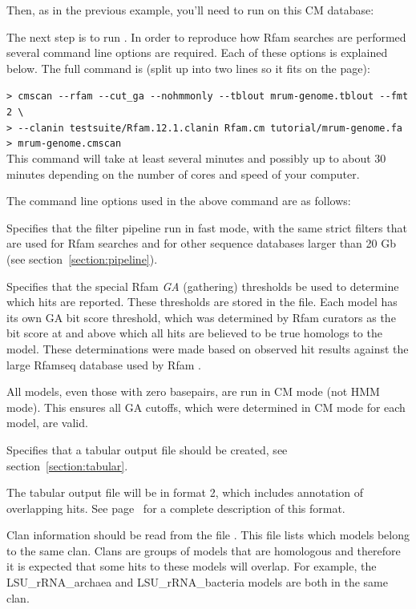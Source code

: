 

Then, as in the previous example, you'll need to run  on
this CM database:


The next step is to run . In order to reproduce how Rfam
searches are performed \citep{Nawrocki15} several command line
options are required. Each of these options is explained below. The
full command is (split up into two lines so it fits on the page): 

\indent\indent\small\verb+> cmscan --rfam --cut_ga --nohmmonly --tblout mrum-genome.tblout --fmt 2 \+\\
\indent\indent\small\verb+> --clanin testsuite/Rfam.12.1.clanin Rfam.cm tutorial/mrum-genome.fa > mrum-genome.cmscan+\\

This command will take at least several minutes and possibly up to
about 30 minutes depending on the number of cores and speed of your
computer. 

The command line options used in the above command are as follows:

\begin{sreitems}{}
\item[\otext{--rfam}] Specifies that the filter pipeline run in fast
  mode, with the same strict filters that are used for Rfam searches
  and for other sequence databases larger than 20 Gb (see
  section~\ref{section:pipeline}). 
%
\item[\otext{--cut\_ga}] Specifies that the special Rfam \emph{GA}
  (gathering) thresholds be used to determine which hits are
  reported. These thresholds are stored in the  file.
  Each model has its own GA bit score threshold, which was determined
  by Rfam curators as the bit score at and above which all hits are
  believed to be true homologs to the model. These determinations were made based on
  observed hit results against the large Rfamseq database used by
  Rfam \citep{Nawrocki15}.
%
\item[\otext{--nohmmonly}] All models, even those with zero basepairs,
  are run in CM mode (not HMM mode). This ensures all GA cutoffs, which were
  determined in CM mode for each model, are valid.
%
\item[\otext{--tblout}] Specifies that a tabular output
  file should be created, see section~\ref{section:tabular}.
%
\item[\otext{--fmt 2}] The tabular output file will be in format 2,
  which includes annotation of overlapping hits. See
  page~\pageref{tabular-format2} for a complete description of this
  format. 
%
\item[\otext{--clanin}] Clan information should be read
  from the file . This file lists
  which models belong to the same clan. Clans are groups of models
  that are homologous and therefore it is expected that some hits to
  these models will overlap. For example, the LSU\_rRNA\_archaea and
  LSU\_rRNA\_bacteria models are both in the same clan.
%
\end{sreitems}

